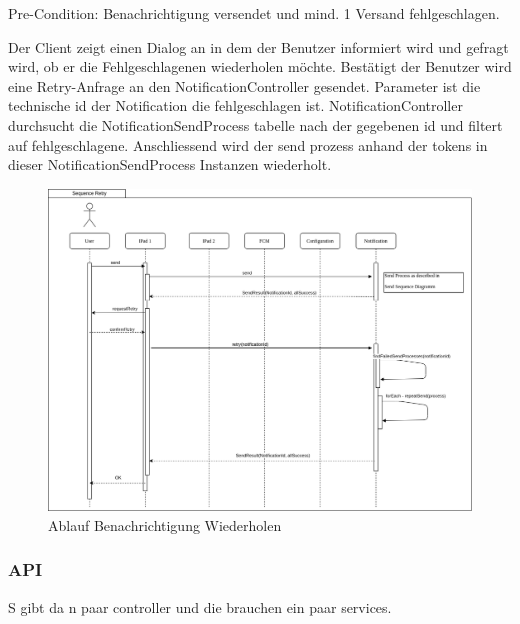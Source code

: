 Pre-Condition: Benachrichtigung versendet und mind. 1 Versand fehlgeschlagen.

Der Client zeigt einen Dialog an in dem der Benutzer informiert wird und gefragt wird, ob er die Fehlgeschlagenen wiederholen möchte.
Bestätigt der Benutzer wird eine Retry-Anfrage an den NotificationController gesendet.
Parameter ist die technische id der Notification die fehlgeschlagen ist.
NotificationController durchsucht die NotificationSendProcess tabelle nach der gegebenen id und filtert auf fehlgeschlagene.
Anschliessend wird der send prozess anhand der tokens in dieser NotificationSendProcess Instanzen wiederholt.

\begin{figure}[h]
    \centering
    \begin{minipage}[b]{1.0\textwidth}
        \includegraphics[width=\textwidth]{graphics/Sequence_Notification_Retry}
        \caption{Ablauf Benachrichtigung Wiederholen}
    \end{minipage}
\end{figure}


\clearpage

\subsubsection{API}

S gibt da n paar controller und die brauchen ein paar services.
